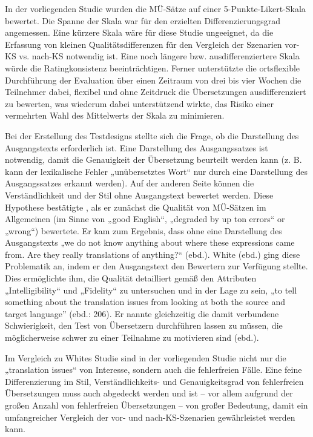 In der vorliegenden Studie wurden die MÜ-Sätze auf einer 5-Punkte-Likert-Skala bewertet. Die Spanne der Skala war für den erzielten Differenzierungsgrad angemessen. Eine kürzere Skala wäre für diese Studie ungeeignet, da die Erfassung von kleinen Qualitätsdifferenzen für den Vergleich der Szenarien vor-KS vs. nach-KS notwendig ist. Eine noch längere bzw. ausdifferenziertere Skala würde die Ratingkonsistenz beeinträchtigen. Ferner unterstützte die ortsflexible Durchführung der Evaluation über einen Zeitraum von drei bis vier Wochen die Teilnehmer dabei, flexibel und ohne Zeitdruck die Übersetzungen ausdifferenziert zu bewerten, was wiederum dabei unterstützend wirkte, das Risiko einer vermehrten Wahl des Mittelwerts der Skala zu minimieren.


Bei der Erstellung des Testdesigns stellte sich die Frage, ob die Darstellung des Ausgangstexts erforderlich ist. Eine Darstellung des Ausgangssatzes ist notwendig, damit die Genauigkeit der Übersetzung beurteilt werden kann (z. B. kann der lexikalische Fehler „unübersetztes Wort“ nur durch eine Darstellung des Ausgangssatzes erkannt werden). Auf der anderen Seite können die Verständlichkeit und der Stil ohne Ausgangstext bewertet werden. Diese Hypothese bestätigte \citet[205]{White2003}, als er zunächst die Qualität von MÜ-Sätzen im Allgemeinen (im Sinne von „good English“, „degraded by up ton errors“ or „wrong“) bewertete. Er kam zum Ergebnis, dass ohne eine Darstellung des Ausgangstexts „we do not know anything about where these expressions came from. Are they really translations of anything?“ (ebd.). White (ebd.) ging diese Problematik an, indem er den Ausgangstext den Bewertern zur Verfügung stellte. Dies ermöglichte ihm, die Qualität detailliert gemäß den Attributen „Intelligibility“ und „Fidelity“ zu untersuchen und in der Lage zu sein, „to tell something about the translation issues from looking at both the source and target language” (ebd.: 206). Er nannte gleichzeitig die damit verbundene Schwierigkeit, den Test von Übersetzern durchführen lassen zu müssen, die möglicherweise schwer zu einer Teilnahme zu motivieren sind (ebd.).

Im Vergleich zu Whites Studie sind in der vorliegenden Studie nicht nur die „translation issues“ von Interesse, sondern auch die fehlerfreien Fälle. Eine feine Differenzierung im Stil, Verständlichkeits- und Genauigkeitsgrad von fehlerfreien Übersetzungen muss auch abgedeckt werden und ist -- vor allem aufgrund der großen Anzahl von fehlerfreien Übersetzungen -- von großer Bedeutung, damit ein umfangreicher Vergleich der vor- und nach-KS-Szenarien gewährleistet werden kann.

